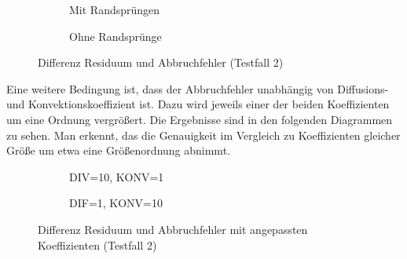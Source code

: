 \begin{figure}[ht]
\centering
   \begin{subfigure}{0.49\linewidth} \centering
  \caption{Mit Randsprüngen}
   \end{subfigure}
   \begin{subfigure}{0.49\linewidth} \centering
  \caption{Ohne Randsprünge}
   \end{subfigure}
   \caption{Differenz Residuum und Abbruchfehler (Testfall 2)}
\end{figure}

Eine weitere Bedingung ist, dass der Abbruchfehler unabhängig von
Diffusions- und Konvektionskoeffizient ist. Dazu wird jeweils einer der beiden Koeffizienten
um eine Ordnung vergrößert. Die Ergebnisse sind in den folgenden Diagrammen zu sehen.
Man erkennt, das die Genauigkeit im Vergleich zu Koeffizienten gleicher Größe
um etwa eine Größenordnung abnimmt.
\begin{figure}[ht]
\centering
   \begin{subfigure}{0.49\linewidth} \centering
  \caption{DIV=10, KONV=1}
   \end{subfigure}
   \begin{subfigure}{0.49\linewidth} \centering
  \caption{DIF=1, KONV=10}
   \end{subfigure}
   \caption{Differenz Residuum und Abbruchfehler mit angepassten Koeffizienten (Testfall 2)}
\end{figure}
\clearpage

